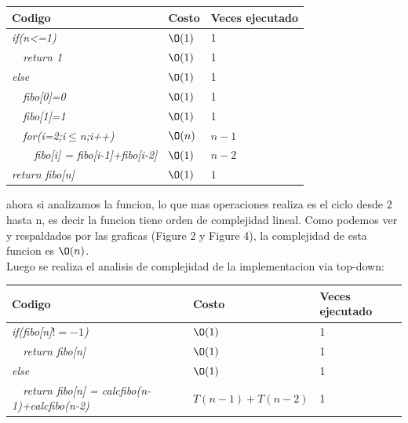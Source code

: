 \documentclass[spanish]{article}
\begin{document}
	\begin{center}
		\begin{table}[H]
			\begin{tabular}{|l|l|l|}
				\hline
				\rowcolor[HTML]{FFCC67} 
				Codigo                           & Costo & Veces ejecutado \\ \hline
				\textit{if(n<=1)}                    & $\O(1)$    & 1               \\ \hline
				\textit{\  \  return 1}                    & $\O(1)$    & 1               \\ \hline
				\textit{else}                    & $\O(1)$    & 1               \\ \hline
				\textit{\  \  fibo[0]=0}                    & $\O(1)$    & 1               \\ \hline
				\textit{\  \  fibo[1]=1}                    & $\O(1)$    & 1               \\ \hline				
				\textit{\  \  for(i=2;i$\leq$n;i++)} & $\O(n)$    & $n-1$             \\ \hline
				\textit{\  \  \  \  fibo[i] = fibo[i-1]+fibo[i-2]}                 & $\O(1)$    & $n-2$               \\ \hline
				\textit{return fibo[n]} & $\O(1)$    & $1$             \\ \hline				
			\end{tabular}
		\end{table}										
	\end{center}
	ahora si analizamos la funcion, lo que mas operaciones realiza es el ciclo desde 2 hasta n, es decir la funcion tiene orden de complejidad lineal.
 	Como podemos ver y respaldados por las graficas (Figure 2 y Figure 4), la complejidad de esta funcion es $\O(n)$.\\
 	Luego se realiza el analisis de complejidad de la implementacion via top-down:\\
 	\begin{center}
 		\begin{table}[H]
 			\begin{tabular}{|l|l|l|}
 				\hline
 				\rowcolor[HTML]{FFCC67} 
 				Codigo                           & Costo & Veces ejecutado \\ \hline
 				\textit{if(fibo[n]$!=-1$)}                    & $\O(1)$    & 1               \\ \hline
 				\textit{\  \  return fibo[n]}                    & $\O(1)$    & 1               \\ \hline
 				\textit{else}                    & $\O(1)$    & 1               \\ \hline
 				\textit{\  \  return fibo[n] = calcfibo(n-1)+calcfibo(n-2)}                    & $T(n-1)+T(n-2)$    & 1               \\ \hline 				
 			\end{tabular}
 		\end{table}										
 	\end{center}
\end{document}
